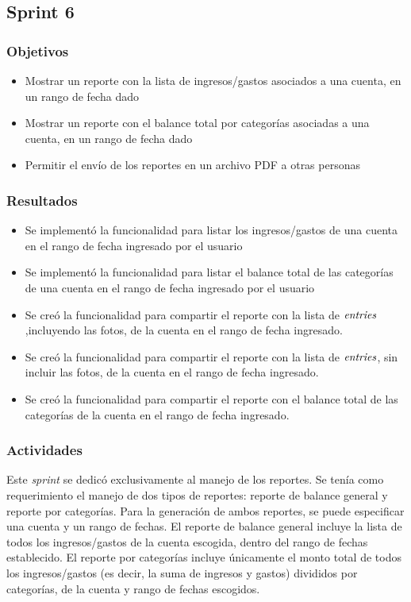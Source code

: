 \subsection{Sprint 6}
\subsubsection{Objetivos}
\begin{itemize}
\item Mostrar un reporte con la lista de ingresos/gastos asociados a una cuenta, en un rango de fecha dado
\item Mostrar un reporte con el balance total por categorías asociadas a una cuenta, en un rango de fecha dado
\item Permitir el envío de los reportes en un archivo PDF a otras personas

\end{itemize}

\subsubsection{Resultados}
\begin{itemize}
\item Se implementó la funcionalidad para listar los ingresos/gastos de una cuenta en el rango de fecha ingresado por el usuario
\item Se implementó la funcionalidad para listar el balance total de las categorías de una cuenta en el rango de fecha ingresado por el usuario
\item Se creó la funcionalidad para compartir el reporte con la lista de $\textit{entries}$,incluyendo las fotos, de la cuenta en el rango de fecha ingresado.
\item Se creó la funcionalidad para compartir el reporte con la lista de $\textit{entries}$, sin incluir las fotos, de la cuenta en el rango de fecha ingresado.
\item Se creó la funcionalidad para compartir el reporte con el balance total de las categorías de la cuenta en el rango de fecha ingresado.
\end{itemize}

\subsubsection{Actividades}
Este \textit{sprint} se dedicó exclusivamente al manejo de los reportes. Se tenía como requerimiento el manejo de dos tipos de reportes: reporte de balance general y reporte por categorías. Para la generación de ambos reportes, se puede especificar una cuenta y un rango de fechas. El reporte de balance general incluye la lista de todos los ingresos/gastos de la cuenta escogida, dentro del rango de fechas establecido. El reporte por categorías incluye únicamente el monto total de todos los ingresos/gastos (es decir, la suma de ingresos y gastos) divididos por categorías, de la cuenta y rango de fechas escogidos.

